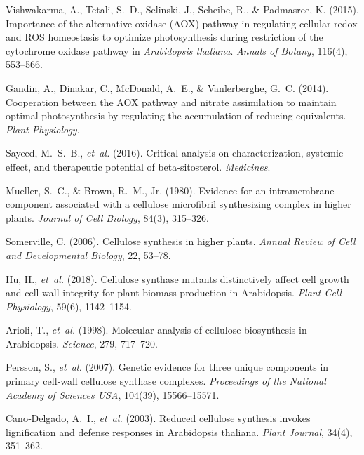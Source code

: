 \documentclass[10pt,letterpaper]{article}
\begin{document}
\begin{thebibliography}{10}
Vishwakarma, A., Tetali, S.~D., Selinski, J., Scheibe, R., \& Padmasree, K. (2015).
\newblock Importance of the alternative oxidase (AOX) pathway in regulating cellular redox and ROS homeostasis to optimize photosynthesis during restriction of the cytochrome oxidase pathway in \emph{Arabidopsis thaliana}.
\newblock \emph{Annals of Botany}, 116(4), 553–566.
\newblock {}

Gandin, A., Dinakar, C., McDonald, A.~E., \& Vanlerberghe, G.~C. (2014).
\newblock Cooperation between the AOX pathway and nitrate assimilation to maintain optimal photosynthesis by regulating the accumulation of reducing equivalents.
\newblock \emph{Plant Physiology}.
  
Sayeed, M.~S.~B., \emph{et~al.} (2016).  
Critical analysis on characterization, systemic effect, and therapeutic potential of beta‑sitosterol.  
\emph{Medicines}.

Mueller, S.~C., \& Brown, R.~M., Jr. (1980).  
Evidence for an intramembrane component associated with a cellulose microfibril synthesizing complex in higher plants.  
\emph{Journal of Cell Biology}, 84(3), 315–326.

Somerville, C. (2006).  
Cellulose synthesis in higher plants.  
\emph{Annual Review of Cell and Developmental Biology}, 22, 53–78.

Hu, H., \emph{et~al.} (2018).  
Cellulose synthase mutants distinctively affect cell growth and cell wall integrity for plant biomass production in Arabidopsis.  
\emph{Plant Cell Physiology}, 59(6), 1142–1154.

Arioli, T., \emph{et~al.} (1998).  
Molecular analysis of cellulose biosynthesis in Arabidopsis.  
\emph{Science}, 279, 717–720.

Persson, S., \emph{et~al.} (2007).  
Genetic evidence for three unique components in primary cell‐wall cellulose synthase complexes.  
\emph{Proceedings of the National Academy of Sciences USA}, 104(39), 15566–15571.

Cano‐Delgado, A.~I., \emph{et~al.} (2003).  
Reduced cellulose synthesis invokes lignification and defense responses in Arabidopsis thaliana.  
\emph{Plant Journal}, 34(4), 351–362.


\end{thebibliography}
\end{document}
